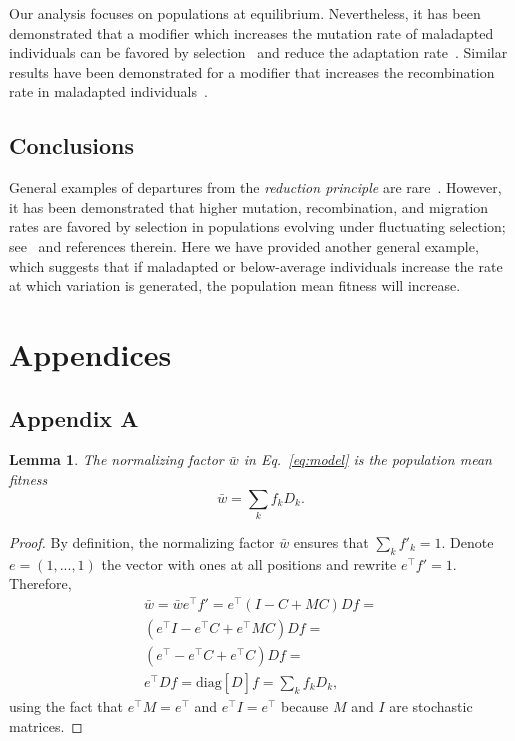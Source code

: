 \documentclass[9pt, a4paper, twocolumn]{extarticle}
\newcommand*{\tr}{^\intercal}
\newcommand{\matrx}[1]{{\left[ \stackrel{}{#1}\right]}}
\newcommand{\diag}[1]{\mbox{diag}\matrx{#1}}
\newtheorem{lemma}{Lemma}
\begin{document}
Our analysis focuses on populations at equilibrium.
Nevertheless, it has been demonstrated that a modifier which increases the mutation rate of maladapted individuals can be favored by selection~\citep{Ram2012} and reduce the adaptation rate~\citep{Ram2014}.
Similar results have been demonstrated for a modifier that increases the recombination rate in maladapted individuals~\citep{Hadany2003a,Hadany2003b}.

\subsection*{Conclusions}

General examples of departures from the \emph{reduction principle} are rare~\citep{Altenberg2017}.
However, it has been demonstrated that higher mutation, recombination, and migration rates are favored by selection in populations evolving under fluctuating selection; see~\citet{Carja2014} and references therein.
Here we have provided another general example, which suggests that if maladapted or below-average individuals increase the rate at which variation is generated, the population mean fitness will increase.

\section*{Appendices}
\subsection*{Appendix A}\label{sec:AppA}

\begin{lemma}
The normalizing factor $\bar{w}$ in Eq.~\ref{eq:model} is the population mean fitness
\begin{equation}
\bar{w} = \sum_k{f_k D_k}.
\end{equation}
\end{lemma}

\begin{proof}
By definition, the normalizing factor $\bar{w}$ ensures that $\sum_k{f'_k}=1$.
Denote $e = (1, ..., 1)$ the vector with ones at all positions and rewrite $e\tr f' = 1$.
Therefore, 
\begin{multline}\label{eq:mean_fitness}
\bar{w} = 
\bar{w} e\tr f' = 
e\tr (I - C + M C) D f = \\
(e\tr I - e\tr C + e\tr M C) D f = \\
(e\tr - e\tr C + e\tr C) D f = \\
e\tr D f = 
\diag{D} f = 
\sum_k{f_k D_k},
\end{multline}
using the fact that $e\tr M = e\tr$ and $e\tr I = e\tr$ because $M$ and $I$ are stochastic matrices.
\end{proof}
\end{document}
